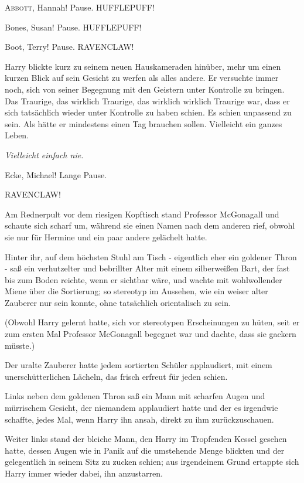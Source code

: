 
\lettrine{\loq A}{bbott}, Hannah!\grqq{} Pause. \glqq{}HUFFLEPUFF!\grqq{}

\glqq{}Bones, Susan!\grqq{} Pause. \glqq{}HUFFLEPUFF!\grqq{}

\glqq{}Boot, Terry!\grqq{} Pause. \glqq{}RAVENCLAW!\grqq{}

Harry blickte kurz zu seinem neuen Hauskameraden hinüber, mehr um einen kurzen
Blick auf sein Gesicht zu werfen als alles andere. Er versuchte immer noch, sich
von seiner Begegnung mit den Geistern unter Kontrolle zu bringen. Das Traurige,
das wirklich Traurige, das wirklich wirklich Traurige war, dass er sich
tatsächlich wieder unter Kontrolle zu haben schien. Es schien unpassend zu sein.
Als hätte er mindestens einen Tag brauchen sollen. Vielleicht ein ganzes Leben.

\emph{Vielleicht einfach nie.}

\glqq{}Ecke, Michael!\grqq{} Lange Pause.

\glqq{}RAVENCLAW!\grqq{}

Am Rednerpult vor dem riesigen Kopftisch stand Professor McGonagall und schaute
sich scharf um, während sie einen Namen nach dem anderen rief, obwohl sie nur
für Hermine und ein paar andere gelächelt hatte.

Hinter ihr, auf dem höchsten Stuhl am Tisch - eigentlich eher ein goldener Thron
- saß ein verhutzelter und bebrillter Alter mit einem silberweißen Bart, der
fast bis zum Boden reichte, wenn er sichtbar wäre, und wachte mit wohlwollender
Miene über die Sortierung; so stereotyp im Aussehen, wie ein weiser alter
Zauberer nur sein konnte, ohne tatsächlich orientalisch zu sein.

(Obwohl Harry gelernt hatte, sich vor stereotypen Erscheinungen zu hüten, seit
er zum ersten Mal Professor McGonagall begegnet war und dachte, dass sie gackern
müsste.)

Der uralte Zauberer hatte jedem sortierten Schüler applaudiert, mit einem
unerschütterlichen Lächeln, das frisch erfreut für jeden schien.

Links neben dem goldenen Thron saß ein Mann mit scharfen Augen und mürrischem
Gesicht, der niemandem applaudiert hatte und der es irgendwie schaffte, jedes
Mal, wenn Harry ihn ansah, direkt zu ihm zurückzuschauen.

Weiter links stand der bleiche Mann, den Harry im Tropfenden Kessel gesehen
hatte, dessen Augen wie in Panik auf die umstehende Menge blickten und der
gelegentlich in seinem Sitz zu zucken schien; aus irgendeinem Grund ertappte
sich Harry immer wieder dabei, ihn anzustarren.

